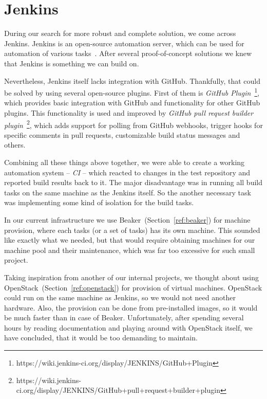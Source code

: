 \section{Jenkins}
    During our search for more robust and complete solution, we come across
    Jenkins. Jenkins is an open-source automation server, which can be used
    for automation of various tasks~\cite{jenkins-docs}. After several
    proof-of-concept solutions we knew that Jenkins is something we can
    build on.

    Nevertheless, Jenkins itself lacks integration with GitHub. Thankfully, that
    could be solved by using several open-source plugins. First of them is
    \textit{GitHub Plugin}~\footnote{https://wiki.jenkins-ci.org/display/JENKINS/GitHub+Plugin},
    which provides basic integration with GitHub and functionality for other
    GitHub plugins. This functionality is used and improved by
    \textit{GitHub pull request builder plugin}~\footnote{https://wiki.jenkins-ci.org/display/JENKINS/GitHub+pull+request+builder+plugin},
    which adds support for polling from GitHub webhooks, trigger hooks for
    specific comments in pull requests, customizable build status messages and
    others.

    Combining all these things above together, we were able to create a working
    automation system -- \textit{CI} -- which reacted to changes in the test
    repository and reported build results back to it. The major disadvantage
    was in running all build tasks on the same machine as the Jenkins itself.
    So the another necessary task was implementing some kind of isolation
    for the build tasks.

    In our current infrastructure we use Beaker~(Section~\ref{ref:beaker}) for machine
    provision, where each tasks (or a set of tasks) has its own machine. This sounded like exactly
    what we needed, but that would require obtaining machines for our machine pool
    and their maintenance, which was far too excessive for such small project.

    Taking inspiration from another of our internal projects, we thought about
    using OpenStack~(Section~\ref{ref:openstack}) for provision of virtual
    machines. OpenStack could run on the same machine as Jenkins, so we would not
    need another hardware. Also, the provision can be done from pre-installed
    images, so it would be much faster than in case of Beaker. Unfortunately,
    after spending several hours by reading documentation and playing around with
    OpenStack itself, we have concluded, that it would be too demanding
    to maintain.

